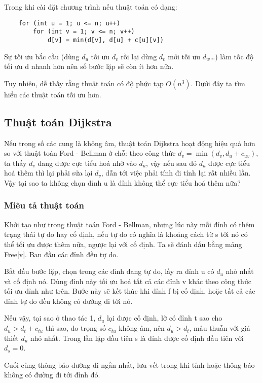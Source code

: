 Trong khi cài đặt chương trình nếu thuật toán có dạng:
\begin{verbatim}
    for (int u = 1; u <= n; u++)
        for (int v = 1; v <= n; v++)
            d[v] = min(d[v], d[u] + c[u][v])
\end{verbatim}
Sự tối ưu bắc cầu (dùng $d_u$ tối ưu $d_v$ rồi lại dùng $d_v$ mới tối ưu $d_w$\dots) làm tốc độ tối ưu d nhanh hơn nên số bước lặp sẽ còn ít hơn nữa.

Tuy nhiên, dễ thấy rằng thuật toán có độ phức tạp $O(n^3)$. Dưới đây ta tìm hiểu các thuật toán tối ưu hơn.

\subsection{Thuật toán Dijkstra}
Nếu trọng số các cung là không âm, thuật toán Dijkstra hoạt động hiệu quả hơn so với thuật toán Ford - Bellman ở chỗ: theo công thức $d_v=\min(d_v,d_u+c_{uv})$, ta thấy $d_v$ đang được cực tiểu hoá nhờ vào $d_u$, vậy nếu sau đó $d_u$ được cực tiểu hoá thêm thì lại phải sửa lại $d_v$, dẫn tới việc phải tính đi tính lại rất nhiều lần. Vậy tại sao ta không chọn đỉnh u là đỉnh không thể cực tiểu hoá thêm nữa?

\subsubsection{Miêu tả thuật toán}
Khởi tạo như trong thuật toán Ford - Bellman, nhưng lúc này mỗi đỉnh có thêm trạng thái tự do hay cố định, nếu tự do có nghĩa là khoảng cách từ s tới nó có thể tối ưu được thêm nữa, ngược lại với cố định. Ta sẽ đánh dấu bằng mảng Free[v]. Ban đầu các đỉnh đều tự do.

Bắt đầu bước lặp, chọn trong các đỉnh đang tự do, lấy ra đỉnh u có $d_u$ nhỏ nhất và cố định nó. Dùng đỉnh này tối ưu hoá tất cả các đỉnh v khác theo công thức tối ưu đỉnh như trên. Bước này sẽ kết thúc khi đỉnh f bị cố định, hoặc tất cả các đỉnh tự do đều không có đường đi tới nó.

Nếu vậy, tại sao ở thao tác 1, $d_u$ lại được cố định, lỡ có đỉnh t sao cho $d_u>d_t+c_{tu}$ thì sao, do trọng số $c_{tu}$ không âm, nên $d_u>d_t$, mâu thuẫn với giả thiết $d_u$ nhỏ nhất. Trong lần lặp đầu tiên s là đỉnh được cố định đầu tiên với $d_s=0$.

Cuối cùng thông báo đường đi ngắn nhất, lưu vết trong khi tính hoặc thông báo không có đường đi tới đỉnh đó.

